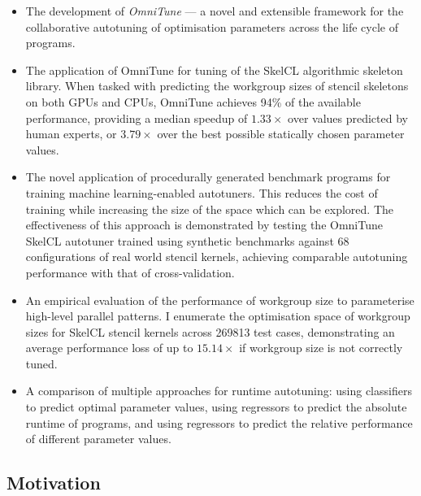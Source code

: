 \documentclass[nonatbib,preprint,11pt]{sigplanconf}
\begin{document}
\begin{itemize}
\item The development of \emph{OmniTune} --- a novel and extensible
  framework for the collaborative autotuning of optimisation
  parameters across the life cycle of programs.
\item The application of OmniTune for tuning of the SkelCL algorithmic
  skeleton library. When tasked with predicting the workgroup sizes of
  stencil skeletons on both GPUs and CPUs, OmniTune achieves 94\% of
  the available performance, providing a median speedup of
  $1.33\times$ over values predicted by human experts, or $3.79\times$
  over the best possible statically chosen parameter values.
\item The novel application of procedurally generated benchmark
  programs for training machine learning-enabled autotuners. This
  reduces the cost of training while increasing the size of the space
  which can be explored. The effectiveness of this approach is
  demonstrated by testing the OmniTune SkelCL autotuner trained using
  synthetic benchmarks against 68 configurations of real world stencil
  kernels, achieving comparable autotuning performance with that of
  cross-validation.
\item An empirical evaluation of the performance of workgroup size to
  parameterise high-level parallel patterns. I enumerate the
  optimisation space of workgroup sizes for SkelCL stencil kernels
  across 269813 test cases, demonstrating an average performance loss
  of up to $15.14\times$ if workgroup size is not correctly tuned.
\item A comparison of multiple approaches for runtime autotuning:
  using classifiers to predict optimal parameter values, using
  regressors to predict the absolute runtime of programs, and using
  regressors to predict the relative performance of different
  parameter values.
\end{itemize}


\subsection{Motivation}
\end{document}
